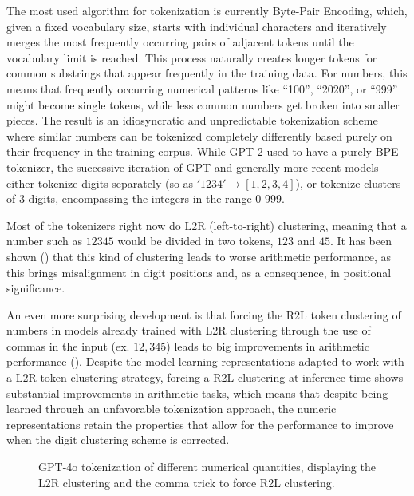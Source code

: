 \documentclass[
  a4paper, twoside, 10pt, titlepage]{book}
\makeatletter
\newcommand*\pandocbounded[1]{%
  \sbox\pandoc@box{#1}%
  \Gscale@div\@tempa{\textheight}{\dimexpr\ht\pandoc@box+\dp\pandoc@box\relax}%
  \Gscale@div\@tempb{\linewidth}{\wd\pandoc@box}%
  \ifdim\@tempb\p@<\@tempa\p@\let\@tempa\@tempb\fi%
  \ifdim\@tempa\p@<\p@\scalebox{\@tempa}{\usebox\pandoc@box}%
  \else\usebox{\pandoc@box}%
  \fi%
}
\makeatother
\begin{document}
The most used algorithm for tokenization is currently Byte-Pair
Encoding, which, given a fixed vocabulary size, starts with individual
characters and iteratively merges the most frequently occurring pairs of
adjacent tokens until the vocabulary limit is reached. This process
naturally creates longer tokens for common substrings that appear
frequently in the training data. For numbers, this means that frequently
occurring numerical patterns like ``100'', ``2020'', or ``999'' might
become single tokens, while less common numbers get broken into smaller
pieces. The result is an idiosyncratic and unpredictable tokenization
scheme where similar numbers can be tokenized completely differently
based purely on their frequency in the training corpus. While GPT-2 used
to have a purely BPE tokenizer, the successive iteration of GPT and
generally more recent models either tokenize digits separately (so as
\('1234' \rightarrow [1, 2, 3, 4]\)), or tokenize clusters of 3 digits,
encompassing the integers in the range 0-999.

Most of the tokenizers right now do L2R (left-to-right) clustering,
meaning that a number such as \(12345\) would be divided in two tokens,
\(123\) and \(45\). It has been shown () that this kind of clustering leads to worse arithmetic
performance, as this brings misalignment in digit positions and, as a
consequence, in positional significance.

An even more surprising development is that forcing the R2L token
clustering of numbers in models already trained with L2R clustering
through the use of commas in the input (ex. \(12,345\)) leads to big
improvements in arithmetic performance (). Despite the model learning representations adapted
to work with a L2R token clustering strategy, forcing a R2L clustering
at inference time shows substantial improvements in arithmetic tasks,
which means that despite being learned through an unfavorable
tokenization approach, the numeric representations retain the properties
that allow for the performance to improve when the digit clustering
scheme is corrected.

\begin{figure}
\centering
\pandocbounded{\texttt{[image: res/gpt4o-tokenization.png]}}
\caption{GPT-4o tokenization of different numerical quantities,
displaying the L2R clustering and the comma trick to force R2L
clustering.}
\end{figure}
\end{document}
